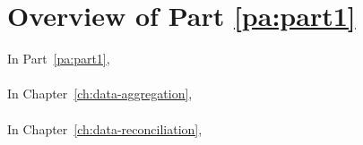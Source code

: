 \chapter*{Overview of Part \ref{pa:part1}}

In Part~\ref{pa:part1},
\\
\\
In Chapter~\ref{ch:data-aggregation},
\\
\\
In Chapter~\ref{ch:data-reconciliation},
